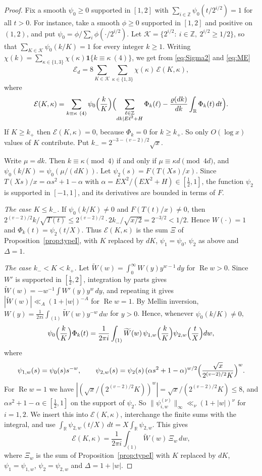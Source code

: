 \documentclass[11pt]{amsart}
\theoremstyle{remark}
\theoremstyle{definition}
\numberwithin{equation}{section}
\newcommand{\Z}{\mathbb{Z}}
\newcommand{\R}{\mathbb{R}}
\newcommand{\one}{\mathbf{1}}
\begin{document}
\begin{proof}
Fix a smooth $\psi_0\ge0$ supported in $[1,2]$ with $\sum_{i\in\Z}\psi_0(t/2^{i/2})=1$ for all $t>0$. For instance, take a smooth $\phi\ge0$ supported in $[1,2]$ and positive on $(1,2)$, and put $\psi_0=\phi/\sum_i\phi(\cdot/2^{i/2})$. Let $\mathcal K=\{2^{i/2}:\ i\in\Z,\ 2^{i/2}\ge1/2\}$, so that $\sum_{K\in\mathcal K}\psi_0(k/K)=1$ for every integer $k\ge1$. Writing $\chi(k)=\sum_{\kappa\in\{1,3\}}\chi(\kappa)\one\{k\equiv\kappa\ (4)\}$, we get from \eqref{eq:Sigma2} and \eqref{eq:ME}
\[
\mathcal E_d=8\sum_{K\in\mathcal K}\sum_{\kappa\in\{1,3\}}\chi(\kappa)\,\mathcal E(K,\kappa),
\]
where
\[
\mathcal E(K,\kappa)=\sum_{k\equiv\kappa\ (4)}\psi_0\Bigl(\frac kK\Bigr)\Bigl(\sum_{\substack{\ell\in\Z\\ dk\mid E\ell^2+H}}\Phi_k(\ell)-\frac{\varrho(dk)}{dk}\int_\R\Phi_k(t)\,dt\Bigr).
\]
If $K\ge k_+$ then $\mathcal E(K,\kappa)=0$, because $\Phi_k=0$ for $k\ge k_+$. So only $O(\log x)$ values of $K$ contribute. Put $k_-=2^{-3-(v-2)/2}\sqrt x$.

Write $\mu=dk$. Then $k\equiv\kappa\pmod 4$ if and only if $\mu\equiv\kappa d\pmod{4d}$, and $\psi_0(k/K)=\psi_0(\mu/(dK))$. Let $\psi_2(s)=F(T(Xs)/x)$. Since $T(Xs)/x=\alpha s^2+1-\alpha$ with $\alpha=EX^2/(EX^2+H)\in[\frac12,1]$, the function $\psi_2$ is supported in $[-1,1]$, and its derivatives are bounded in terms of $F$.

\emph{The case $K\le k_-$.} If $\psi_0(k/K)\ne0$ and $F(T(t)/x)\ne0$, then $2^{(v-2)/2}k/\sqrt{T(t)}\le2^{(v-2)/2}\cdot2k_-/\sqrt{x/2}=2^{-3/2}<1/2$. Hence $W(\cdot)=1$ and $\Phi_k(t)=\psi_2(t/X)$. Thus $\mathcal E(K,\kappa)$ is the sum $\Xi$ of Proposition~\ref{prop:typeI}, with $K$ replaced by $dK$, $\psi_1=\psi_0$, $\psi_2$ as above and $\Delta=1$.

\emph{The case $k_-<K<k_+$.} Let $\widetilde W(w)=\int_0^\infty W(y)y^{w-1}\,dy$ for $\operatorname{Re}w>0$. Since $W'$ is supported in $[\frac12,2]$, integration by parts gives $\widetilde W(w)=-w^{-1}\int W'(y)y^{w}\,dy$, and repeating it gives $|\widetilde W(w)|\ll_A(1+|w|)^{-A}$ for $\operatorname{Re}w=1$. By Mellin inversion, $W(y)=\frac1{2\pi i}\int_{(1)}\widetilde W(w)y^{-w}\,dw$ for $y>0$. Hence, whenever $\psi_0(k/K)\ne0$,
\[
\psi_0\Bigl(\frac kK\Bigr)\Phi_k(t)=\frac1{2\pi i}\int_{(1)}\widetilde W(w)\,\psi_{1,w}\Bigl(\frac kK\Bigr)\psi_{2,w}\Bigl(\frac tX\Bigr)dw,
\]
where
\[
\psi_{1,w}(s)=\psi_0(s)s^{-w},\qquad\psi_{2,w}(s)=\psi_2(s)\,(\alpha s^2+1-\alpha)^{w/2}\Bigl(\frac{\sqrt x}{2^{(v-2)/2}K}\Bigr)^{w}.
\]
For $\operatorname{Re}w=1$ we have $|(\sqrt x/(2^{(v-2)/2}K))^w|=\sqrt x/(2^{(v-2)/2}K)\le8$, and $\alpha s^2+1-\alpha\in[\frac12,1]$ on the support of $\psi_2$. So $\|\psi_{i,w}^{(\nu)}\|_\infty\ll_\nu(1+|w|)^\nu$ for $i=1,2$. We insert this into $\mathcal E(K,\kappa)$, interchange the finite sums with the integral, and use $\int_\R\psi_{2,w}(t/X)\,dt=X\int_\R\psi_{2,w}$. This gives
\[
\mathcal E(K,\kappa)=\frac1{2\pi i}\int_{(1)}\widetilde W(w)\,\Xi_w\,dw,
\]
where $\Xi_w$ is the sum of Proposition~\ref{prop:typeI} with $K$ replaced by $dK$, $\psi_1=\psi_{1,w}$, $\psi_2=\psi_{2,w}$ and $\Delta=1+|w|$.


\end{proof}
\end{document}
